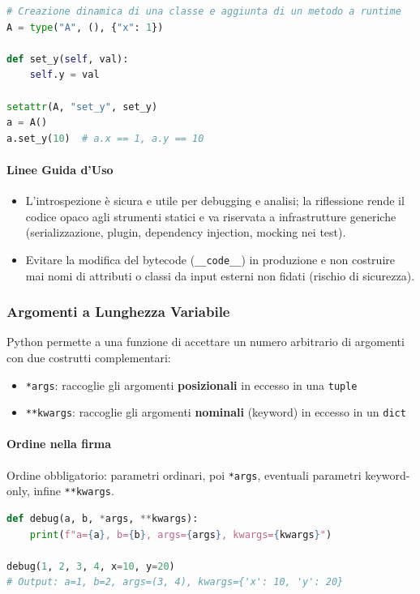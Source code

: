 \documentclass[12pt]{extarticle}
\begin{document}
\begin{lstlisting}[language=Python]
# Creazione dinamica di una classe e aggiunta di un metodo a runtime
A = type("A", (), {"x": 1})

def set_y(self, val):
    self.y = val

setattr(A, "set_y", set_y)
a = A()
a.set_y(10)  # a.x == 1, a.y == 10
\end{lstlisting}

\paragraph{Linee Guida d'Uso}
\begin{itemize}
\item L'introspezione è sicura e utile per debugging e analisi; la riflessione rende il codice opaco agli strumenti statici e va riservata a infrastrutture generiche (serializzazione, plugin, dependency injection, mocking nei test).
\item Evitare la modifica del bytecode (\texttt{\_\_code\_\_}) in produzione e non costruire mai nomi di attributi o classi da input esterni non fidati (rischio di sicurezza).
\end{itemize}

\subsubsection{Argomenti a Lunghezza Variabile}
Python permette a una funzione di accettare un numero arbitrario di argomenti con due costrutti complementari:
\begin{itemize}
    \item \texttt{*args}: raccoglie gli argomenti \textbf{posizionali} in eccesso in una \texttt{tuple}
    \item \texttt{**kwargs}: raccoglie gli argomenti \textbf{nominali} (keyword) in eccesso in un \texttt{dict}
\end{itemize}

\paragraph{Ordine nella firma} Ordine obbligatorio: parametri ordinari, poi \texttt{*args}, eventuali parametri keyword-only, infine \texttt{**kwargs}.

\begin{lstlisting}[language=Python]
def debug(a, b, *args, **kwargs):
    print(f"a={a}, b={b}, args={args}, kwargs={kwargs}")

debug(1, 2, 3, 4, x=10, y=20)
# Output: a=1, b=2, args=(3, 4), kwargs={'x': 10, 'y': 20}
\end{lstlisting}
\end{document}
